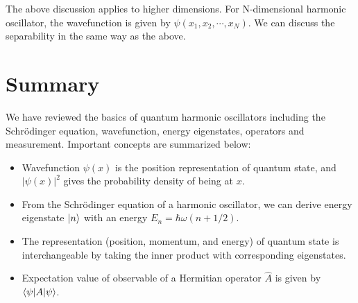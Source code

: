 The above discussion applies to higher dimensions. For N-dimensional harmonic oscillator, the wavefunction is given by $\psi(x_1, x_2, \cdots, x_N)$. We can discuss the separability in the same way as the above. 

\section{Summary}
We have reviewed the basics of quantum harmonic oscillators including the Schr\"odinger equation, wavefunction, energy eigenstates, operators and measurement. Important concepts are summarized below:
\begin{itemize}
	\item Wavefunction $\psi(x)$ is the position representation of quantum state, and $|\psi(x)|^2$ gives the probability density of being at $x$.
	\item From the Schr\"odinger equation of a harmonic oscillator, we can derive energy eigenstate $\ket n$ with an energy $E_n = \hbar \omega (n + 1/2)$.
	\item The representation (position, momentum, and energy) of quantum state is interchangeable by taking the inner product with corresponding eigenstates.
	\item Expectation value of observable of a Hermitian operator $\hat A$ is given by $\braket{\psi|A|\psi}$.
\end{itemize}
